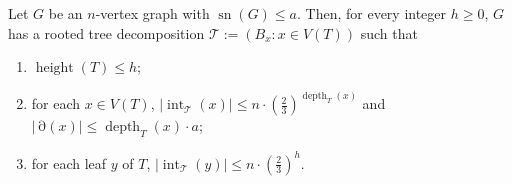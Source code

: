 \documentclass{patmorin}
\newcommand{\pat}[1]{\textcolor{Blue}{[Pat: #1]}}
\DeclareMathOperator{\sep}{sn}
\DeclareMathOperator{\depth}{depth}
\DeclareMathOperator{\height}{height}
\DeclareMathOperator{\interior}{int}
\DeclareMathOperator{\boundary}{\partial}
\newcommand{\hussein}[1]{\textcolor{purple}{HH: #1}}
\begin{document}
\begin{lem}\label{separation_tree}
  Let $G$ be an $n$-vertex graph with $\sep(G)\le a$.  Then, for every integer $h\ge 0$, $G$ has a rooted tree decomposition $\mathcal{T}:=(B_x:x\in V(T))$ such that
  \begin{enumerate}[nosep,nolistsep,label=(\roman*)]
    \item\label{height_bound} $\height(T)\le h$;
    \item\label{size_bounds} for each $x\in V(T)$,  $|\interior_\mathcal{T}(x)|\le n\cdot(\tfrac{2}{3})^{\depth_T(x)}$ and $|\boundary(x)|\le \depth_T(x)\cdot a$;
    \item\label{leaf_size_bounds} for each leaf $y$ of $T$, $|\interior_{\mathcal{T}}(y)|\le n\cdot(\tfrac{2}{3})^h$.
  \end{enumerate}
\end{lem}


\end{document}
